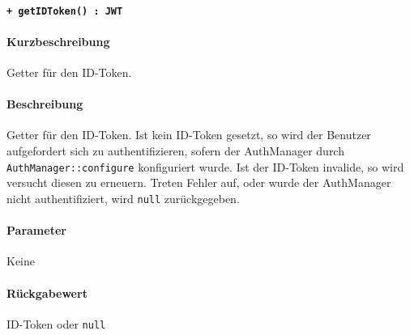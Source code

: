 \paragraph{\texttt{+ getIDToken() : JWT}}\label{AP_AuthManager_getIDToken}%
\paragraph*{Kurzbeschreibung}
Getter für den ID-Token.
\paragraph*{Beschreibung}
Getter für den ID-Token.
Ist kein ID-Token gesetzt, so wird der Benutzer aufgefordert sich zu authentifizieren, sofern der AuthManager durch \verb#AuthManager::configure# konfiguriert wurde.
Ist der ID-Token invalide, so wird versucht diesen zu erneuern.
Treten Fehler auf, oder wurde der AuthManager nicht authentifiziert, wird \verb#null# zurückgegeben.
\paragraph*{Parameter}
Keine
\paragraph*{Rückgabewert}
ID-Token oder \verb#null#